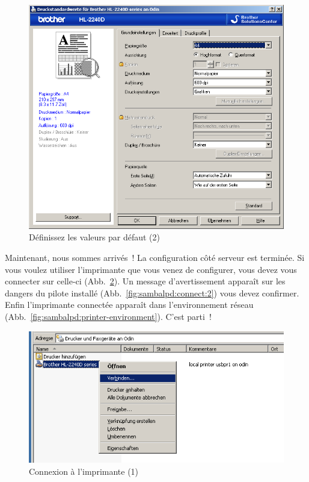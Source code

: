 \begin{figure}[hbt!]
\centering
\includegraphics[width=\columnwidth]{image019}
\caption{Définissez les valeurs par défaut (2)}
\label{fig:sambalpd:props-reloaded:2}
\end{figure}

Maintenant, nous sommes arrivés~! La configuration côté serveur est terminée. Si vous
voulez utiliser l'imprimante que vous venez de configurer, vous devez vous connecter
sur celle-ci (Abb.~\ref{fig:sambalpd:connect:1}). Un message d'avertissement apparaît
sur les dangers du pilote installé (Abb.~\ref{fig:sambalpd:connect:2}) vous devez
confirmer. Enfin l'imprimante connectée apparaît dans l'environnement réseau
(Abb.~\ref{fig:sambalpd:printer-environment}). C'est parti~!

\begin{figure}[hbt!]
\centering
\includegraphics[width=\columnwidth]{image020}
\caption{Connexion à l'imprimante (1)}
\label{fig:sambalpd:connect:1}
\end{figure}

